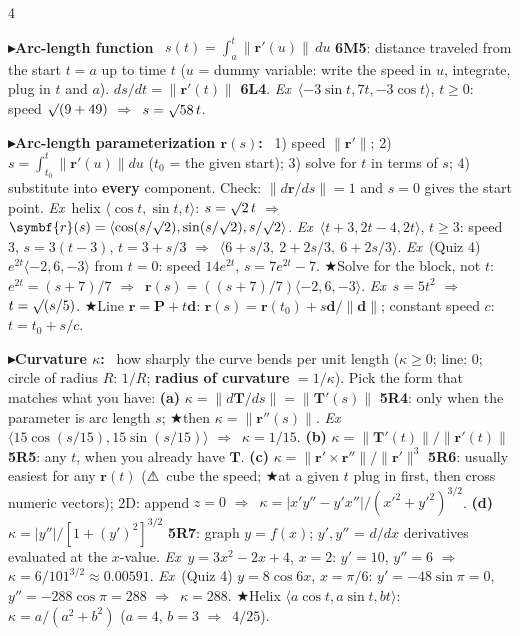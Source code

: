 \documentclass{article}
\newcommand\vb[1]{\symbf{#1}}                 %
\newcommand\nm[1]{\lVert #1\rVert}            %
\newcommand\ip[1]{\langle #1\rangle}          %
\newcommand\sh[1]{{\setlength\fboxsep{0.18pt}\colorbox{black!22}{\textbf{#1}}}} %
\newcommand\pt[1]{\par\textbf{{\symf ▸}#1}\ }  %
\newcommand\ex{\textit{Ex}\ }                  %
\newcommand\warn{{\symf ⚠}}                    %
\newcommand\shc{{\symf ★}}                      %
\newcommand\rt{\smash{\surd}}               %
\newcommand\then{\ensuremath{\Rightarrow}}
\begin{document}
\begin{multicols*}{4}
\pt{Arc-length function} $s(t)=\int_a^t\nm{\vb r'(u)}\,du$ \sh{6M5}: distance traveled from the start $t=a$ up to time $t$ ($u$ = dummy variable: write the speed in $u$, integrate, plug in $t$ and $a$). $ds/dt=\nm{\vb r'(t)}$ \sh{6L4}. \ex $\ip{-3\sin t,7t,-3\cos t}$, $t\ge0$: speed $\rt(9+49)$ \then\ $s=\rt58\,t$.

\pt{Arc-length parameterization $\vb r(s)$:} 1) speed $\nm{\vb r'}$; 2) $s=\int_{t_0}^t\nm{\vb r'(u)}du$ ($t_0$ = the given start); 3) solve for $t$ in terms of $s$; 4) substitute into \textbf{every} component. Check: $\nm{d\vb r/ds}=1$ and $s=0$ gives the start point. \ex helix $\ip{\cos t,\sin t,t}$: $s=\rt2\,t$ \then\ $\vb r(s)=\ip{\cos(s/\rt2),\sin(s/\rt2),s/\rt2}$. \ex $\ip{t+3,2t-4,2t}$, $t\ge3$: speed 3, $s=3(t-3)$, $t=3+s/3$ \then\ $\ip{6+s/3,\ 2+2s/3,\ 6+2s/3}$. \ex (Quiz 4) $e^{2t}\ip{-2,6,-3}$ from $t=0$: speed $14e^{2t}$, $s=7e^{2t}-7$. \shc Solve for the block, not $t$: $e^{2t}=(s+7)/7$ \then\ $\vb r(s)=((s+7)/7)\ip{-2,6,-3}$. \ex $s=5t^2$ \then\ $t=\rt(s/5)$. \shc Line $\vb r=\vb P+t\vb d$: $\vb r(s)=\vb r(t_0)+s\vb d/\nm{\vb d}$; constant speed $c$: $t=t_0+s/c$.

\pt{Curvature $\kappa$:} how sharply the curve bends per unit length ($\kappa\ge0$; line: 0; circle of radius $R$: $1/R$; \textbf{radius of curvature} $=1/\kappa$). Pick the form that matches what you have: \textbf{(a)} $\kappa=\nm{d\vb T/ds}=\nm{\vb T'(s)}$ \sh{5R4}: only when the parameter is arc length $s$; \shc then $\kappa=\nm{\vb r''(s)}$. \ex $\ip{15\cos(s/15),15\sin(s/15)}$ \then\ $\kappa=1/15$. \textbf{(b)} $\kappa=\nm{\vb T'(t)}/\nm{\vb r'(t)}$ \sh{5R5}: any $t$, when you already have $\vb T$. \textbf{(c)} $\kappa=\nm{\vb r'\times\vb r''}/\nm{\vb r'}^3$ \sh{5R6}: usually easiest for any $\vb r(t)$ (\warn\ cube the speed; \shc at a given $t$ plug in first, then cross numeric vectors); 2D: append $z=0$ \then\ $\kappa=|x'y''-y'x''|/(x'^2+y'^2)^{3/2}$. \textbf{(d)} $\kappa=|y''|/[1+(y')^2]^{3/2}$ \sh{5R7}: graph $y=f(x)$; $y',y''$ = $d/dx$ derivatives evaluated at the $x$-value. \ex $y=3x^2-2x+4$, $x=2$: $y'=10$, $y''=6$ \then\ $\kappa=6/101^{3/2}\approx0.00591$. \ex (Quiz 4) $y=8\cos6x$, $x=\pi/6$: $y'=-48\sin\pi=0$, $y''=-288\cos\pi=288$ \then\ $\kappa=288$. \shc Helix $\ip{a\cos t,a\sin t,bt}$: $\kappa=a/(a^2+b^2)$ ($a=4$, $b=3$ \then\ $4/25$).


\end{multicols*}
\end{document}
